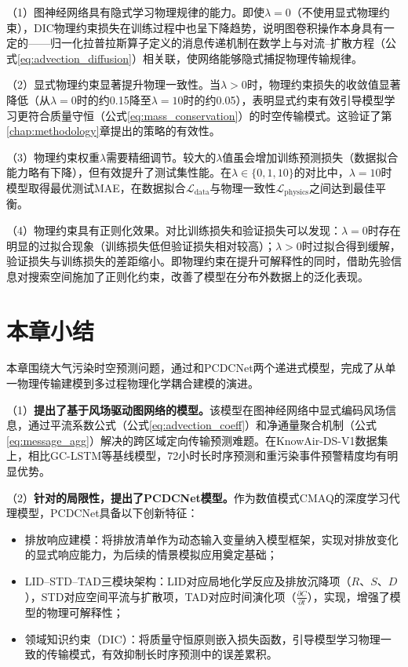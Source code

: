 （1）图神经网络具有隐式学习物理规律的能力。即使$\lambda=0$（不使用显式物理约束），DIC物理约束损失在训练过程中也呈下降趋势，说明图卷积操作本身具有一定的——归一化拉普拉斯算子定义的消息传递机制在数学上与对流--扩散方程（公式\eqref{eq:advection_diffusion}）相关联，使网络能够隐式捕捉物理传输规律。

（2）显式物理约束显著提升物理一致性。当$\lambda>0$时，物理约束损失的收敛值显著降低（从$\lambda=0$时的约0.15降至$\lambda=10$时的约0.05），表明显式约束有效引导模型学习更符合质量守恒（公式\eqref{eq:mass_conservation}）的时空传输模式。这验证了第\ref{chap:methodology}章提出的策略的有效性。

（3）物理约束权重$\lambda$需要精细调节。较大的$\lambda$值虽会增加训练预测损失（数据拟合能力略有下降），但有效提升了测试集性能。在$\lambda \in \{0, 1, 10\}$的对比中，$\lambda=10$时模型取得最优测试MAE，在数据拟合$\mathcal{L}_{\text{data}}$与物理一致性$\mathcal{L}_{\text{physics}}$之间达到最佳平衡。

（4）物理约束具有正则化效果。对比训练损失和验证损失可以发现：$\lambda=0$时存在明显的过拟合现象（训练损失低但验证损失相对较高）；$\lambda>0$时过拟合得到缓解，验证损失与训练损失的差距缩小。即物理约束在提升可解释性的同时，借助先验信息对搜索空间施加了正则化约束，改善了模型在分布外数据上的泛化表现。



\section{本章小结}
\label{sec:pred_summary}

本章围绕大气污染时空预测问题，通过\ModelPred{}和PCDCNet两个递进式模型，完成了从单一物理传输建模到多过程物理化学耦合建模的演进。

（1）\textbf{提出了基于风场驱动图网络的\ModelPred{}模型。}该模型在图神经网络中显式编码风场信息，通过平流系数公式（公式\eqref{eq:advection_coeff}）和净通量聚合机制（公式\eqref{eq:message_agg}）解决\PM 的跨区域定向传输预测难题。在KnowAir-DS-V1数据集上，\ModelPred{}相比GC-LSTM等基线模型，72小时长时序预测和重污染事件预警精度均有明显优势。

（2）\textbf{针对\ModelPred{}的局限性，提出了PCDCNet模型。}作为数值模式CMAQ的深度学习代理模型，PCDCNet具备以下创新特征：

\begin{itemize}
    \item 排放响应建模：将排放清单作为动态输入变量纳入模型框架，实现对排放变化的显式响应能力，为后续的情景模拟应用奠定基础；
    \item LID--STD--TAD三模块架构：LID对应局地化学反应及排放沉降项（$R$、$S$、$D$），STD对应空间平流与扩散项，TAD对应时间演化项（$\frac{\partial C}{\partial t}$），实现，增强了模型的物理可解释性；
    \item 领域知识约束（DIC）：将质量守恒原则嵌入损失函数，引导模型学习物理一致的传输模式，有效抑制长时序预测中的误差累积。
\end{itemize}


